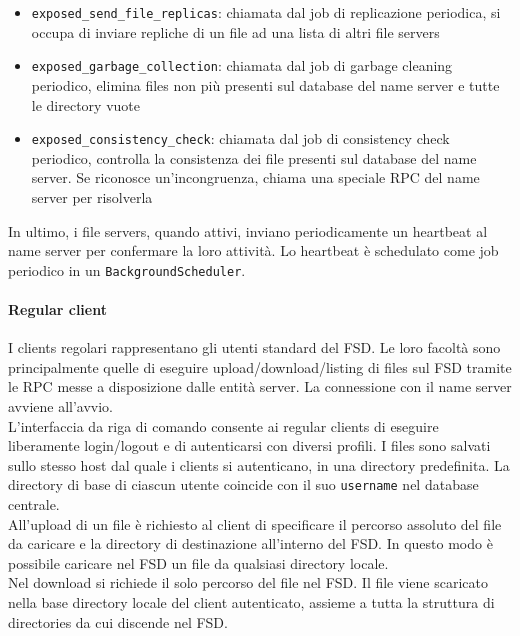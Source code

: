 \documentclass[a4paper, 12pt]{scrreprt}
\begin{document}
            \begin{itemize}

                \item \texttt{exposed\_send\_file\_replicas}: chiamata dal job di replicazione periodica, si occupa di inviare repliche di un file ad una lista di altri file servers

                \item \texttt{exposed\_garbage\_collection}: chiamata dal job di garbage cleaning periodico, elimina files non più presenti sul database del name server e tutte le directory vuote

                \item \texttt{exposed\_consistency\_check}: chiamata dal job di consistency check periodico, controlla la consistenza dei file presenti sul database del name server. Se riconosce un'incongruenza, chiama una speciale RPC del name server per risolverla

            \end{itemize}

            In ultimo, i file servers, quando attivi, inviano periodicamente un heartbeat al name server per confermare la loro attività. Lo heartbeat è schedulato come job periodico in un \texttt{BackgroundScheduler}.

        \paragraph{Regular client}

            I clients regolari rappresentano gli utenti standard del FSD. Le loro facoltà sono principalmente quelle di eseguire upload/download/listing di files sul FSD tramite le RPC messe a disposizione dalle entità server. La connessione con il name server avviene all'avvio.\\
            L'interfaccia da riga di comando consente ai regular clients di eseguire liberamente login/logout e di autenticarsi con diversi profili. I files sono salvati sullo stesso host dal quale i clients si autenticano, in una directory predefinita. La directory di base di ciascun utente coincide con il suo \texttt{username} nel database centrale.\\
            All'upload di un file è richiesto al client di specificare il percorso assoluto del file da caricare e la directory di destinazione all'interno del FSD. In questo modo è possibile caricare nel FSD un file da qualsiasi directory locale.\\
            Nel download si richiede il solo percorso del file nel FSD. Il file viene scaricato nella base directory locale del client autenticato, assieme a tutta la struttura di directories da cui discende nel FSD.
\end{document}
